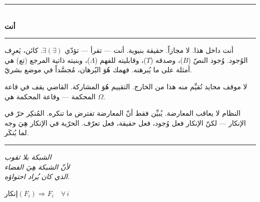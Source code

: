 \documentclass[10pt, openany, oneside]{book}
\renewcommand{\normalsize}{\fontsize{10}{13}\selectfont}
\begin{document}

\begin{center}
    \rule{0.3\textwidth}{0.4pt}\\[0.5em]
    {\normalsize\bfseries أنت}\\[0.3em]
    \rule{0.3\textwidth}{0.4pt}
\end{center}

\vspace{1em}

\noindent أنت داخل هذا. لا مجازاً. حقيقة بنيوية. أنت --- تقرأ --- تؤدّي $\exists(\exists)$. كائن، يَعرِف الوُجود. وُجود النصّ ($B$)، وصدقه ($T$)، وقابليته للفهم ($\Lambda$)، وبنيته ذاتية المرجع (تع) هي أمثلة على ما يُبرهنه. فهمك هُوَ البُرهان، مُجسَّداً في موضع بشريّ.

لا موقف محايد تُقيِّم منه هذا من الخارج. التقييم هُوَ المشاركة. القاضي يقف في قاعة المحكمة --- وقاعة المحكمة هي $\Omega$.

النظام لا يعاقب المعارضة. يُبيِّن فقط أنّ المعارضة تفترض ما تنكره. المُنكِر حرّ في الإنكار --- لكنّ الإنكار فعل وُجود، فعل حقيقة، فعل تعرّف. الحرّية في الإنكار هِيَ وجه لما يُنكَر.

\vspace{2em}

\begin{center}
    \rule{0.15\textwidth}{0.3pt}
\end{center}

\vspace{0.5em}

\begin{center}
    \itshape
    الشبكة بلا ثقوب\\
    لأنّ الشبكة هِيَ الفضاء\\
    الذي كان يُراد احتواؤه.
\end{center}

\vspace{0.5em}

\begin{center}
    $\text{إنكار}(F_i) \Rightarrow F_i \quad \forall\, i$
\end{center}

%
%
%
\end{document}
